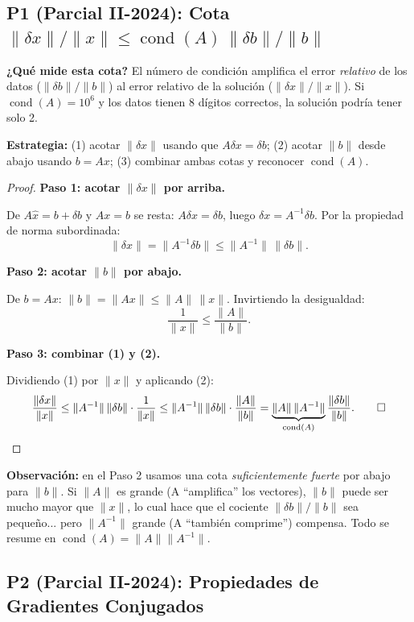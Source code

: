 \documentclass[11pt,a4paper]{article}
\begin{document}
\subsection{P1 (Parcial II-2024): Cota $\|\delta x\|/\|x\| \le \operatorname{cond}(A)\,\|\delta b\|/\|b\|$}
\label{sec:parcial2_2024_p1}

\textbf{¿Qué mide esta cota?} El número de condición amplifica el error \emph{relativo} de los datos ($\|\delta b\|/\|b\|$) al error relativo de la solución ($\|\delta x\|/\|x\|$). Si $\operatorname{cond}(A)=10^6$ y los datos tienen 8 dígitos correctos, la solución podría tener solo 2.

\textbf{Estrategia:} (1) acotar $\|\delta x\|$ usando que $A\delta x=\delta b$; (2) acotar $\|b\|$ desde abajo usando $b=Ax$; (3) combinar ambas cotas y reconocer $\operatorname{cond}(A)$.

\begin{proof}
\textbf{Paso 1: acotar $\|\delta x\|$ por arriba.}

De $A\hat x=b+\delta b$ y $Ax=b$ se resta: $A\delta x=\delta b$, luego $\delta x=A^{-1}\delta b$.
Por la propiedad de norma subordinada:
\[
  \|\delta x\| = \|A^{-1}\delta b\| \le \|A^{-1}\|\,\|\delta b\|. \tag{1}
\]

\textbf{Paso 2: acotar $\|b\|$ por abajo.}

De $b=Ax$: $\|b\|=\|Ax\|\le\|A\|\,\|x\|$. Invirtiendo la desigualdad:
\[
  \frac{1}{\|x\|} \le \frac{\|A\|}{\|b\|}. \tag{2}
\]

\textbf{Paso 3: combinar (1) y (2).}

Dividiendo (1) por $\|x\|$ y aplicando (2):
\[
  \frac{\|\delta x\|}{\|x\|} \le \|A^{-1}\|\,\|\delta b\|\cdot\frac{1}{\|x\|}
  \le \|A^{-1}\|\,\|\delta b\|\cdot\frac{\|A\|}{\|b\|}
  = \underbrace{\|A\|\,\|A^{-1}\|}_{\operatorname{cond}(A)}\frac{\|\delta b\|}{\|b\|}. \qed
\]
\end{proof}

\textbf{Observación:} en el Paso 2 usamos una cota \emph{suficientemente fuerte} por abajo para $\|b\|$. Si $\|A\|$ es grande (A ``amplifica'' los vectores), $\|b\|$ puede ser mucho mayor que $\|x\|$, lo cual hace que el cociente $\|\delta b\|/\|b\|$ sea pequeño... pero $\|A^{-1}\|$ grande (A ``también comprime'') compensa. Todo se resume en $\operatorname{cond}(A)=\|A\|\|A^{-1}\|$.

\subsection{P2 (Parcial II-2024): Propiedades de Gradientes Conjugados}
\label{sec:parcial2_2024_p2}
\end{document}
